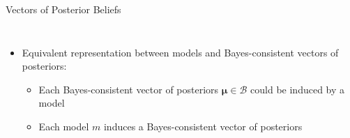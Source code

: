 \documentclass[aspectratio=169]{beamer}
\theoremstyle{definition}
\theoremstyle{plain}
\theoremstyle{plain}
\theoremstyle{definition}
\theoremstyle{plain}
\theoremstyle{plain}
\theoremstyle{plain}
\theoremstyle{plain}
\theoremstyle{remark}
\theoremstyle{definition}
\begin{document}
\begin{frame}[label=PB2]{Vectors of Posterior Beliefs}
\begin{columns}[c]
	\begin{itemize}
            \item<2-> Equivalent representation between models and Bayes-consistent vectors of posteriors:
            \smallskip
            \begin{itemize}
                \item Each Bayes-consistent vector of posteriors \( \bm{\mu} \in \mathcal{B} \) could be induced by a model
                \item Each model \( m \) induces a Bayes-consistent vector of posteriors
            \end{itemize}
        \end{itemize}
\end{columns}

\end{frame}
\end{document}
